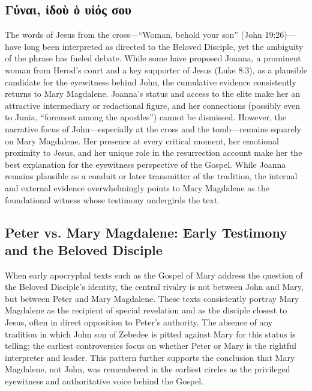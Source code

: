 \subsection{Γύναι, ἰδοὺ ὁ υἱός σου}\label{subsec:ux3b3ux3cdux3b9-ux1f30ux3b4ux3bfux1f7a-ux1f41-ux3c5ux1f31ux3ccux3c2-ux3c3ux3bfux3c5}

The words of Jesus from the cross—“Woman, behold your son” (John 19:26)—have long been interpreted as directed to the Beloved Disciple, yet the ambiguity of the phrase has fueled debate. While some have proposed Joanna, a prominent woman from Herod’s court and a key supporter of Jesus (Luke 8:3), as a plausible candidate for the eyewitness behind John, the cumulative evidence consistently returns to Mary Magdalene. Joanna’s status and access to the elite make her an attractive intermediary or redactional figure, and her connections (possibly even to Junia, “foremost among the apostles”) cannot be dismissed. However, the narrative focus of John—especially at the cross and the tomb—remains squarely on Mary Magdalene. Her presence at every critical moment, her emotional proximity to Jesus, and her unique role in the resurrection account make her the best explanation for the eyewitness perspective of the Gospel. While Joanna remains plausible as a conduit or later transmitter of the tradition, the internal and external evidence overwhelmingly points to Mary Magdalene as the foundational witness whose testimony undergirds the text.

\subsection{Peter vs. Mary Magdalene: Early Testimony and the Beloved Disciple}\label{subsec:when-the-authors-of-the-apocryphal-gospel-of-mary-or-other-early-texts-try-to-argue-who-the-beloved-disciple-is-they-argue-that-it-is-mary-magdalene-rather-than-peter.}

When early apocryphal texts such as the Gospel of Mary address the question of the Beloved Disciple’s identity, the central rivalry is not between John and Mary, but between Peter and Mary Magdalene. These texts consistently portray Mary Magdalene as the recipient of special revelation and as the disciple closest to Jesus, often in direct opposition to Peter’s authority. The absence of any tradition in which John son of Zebedee is pitted against Mary for this status is telling; the earliest controversies focus on whether Peter or Mary is the rightful interpreter and leader. This pattern further supports the conclusion that Mary Magdalene, not John, was remembered in the earliest circles as the privileged eyewitness and authoritative voice behind the Gospel.

